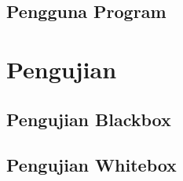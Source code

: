 \subsection{Pengguna Program}

\section{Pengujian}

\subsection{Pengujian Blackbox}

\subsection{Pengujian Whitebox}

\newpage